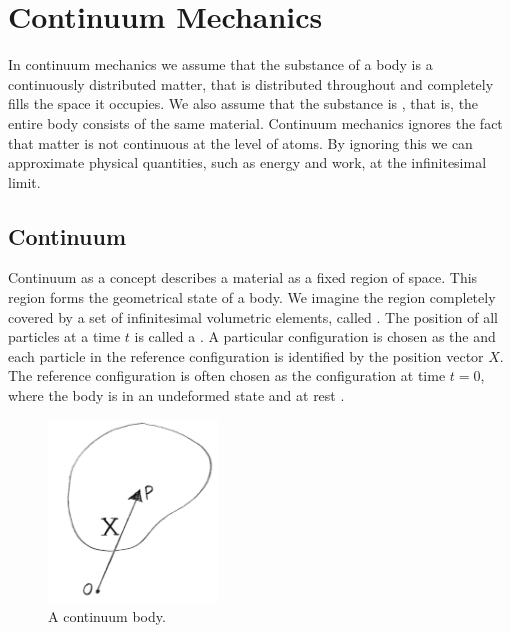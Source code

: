 


\section{Continuum Mechanics}
\label{sec:continuum}
In continuum mechanics we assume that the substance of a body is a
continuously distributed matter, that is distributed
throughout and completely fills the space it occupies. We also assume
that the substance is , that is, the entire body
consists of the same material. Continuum
mechanics ignores the fact that matter is not continuous at the level
of atoms. By ignoring this we can approximate physical quantities, 
such as energy and work, at the infinitesimal limit.

\subsection{Continuum}
Continuum as a concept describes a material as a fixed region of
space. This region forms the geometrical state of a body. We imagine the
region completely covered by a set of infinitesimal volumetric
elements, called . The position of all particles at a
time $t$ is called a .
%
A particular configuration is chosen as the  and each particle in the reference configuration is
identified by the position vector $X$. The reference configuration is often
chosen as the configuration at time $t=0$, where the body
is in an undeformed state and at rest
.


\begin{figure}
  \centering
  \includegraphics[width=4.5cm]{./images/physics_continuum_body.png}
\caption{A continuum body.}
\label{fig:continuum}
\end{figure}

